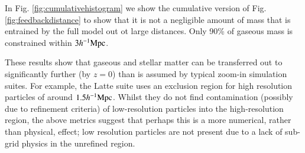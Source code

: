 In Fig. \ref{fig:cumulativehistogram} we show the cumulative version of Fig. 
\ref{fig:feedbackdistance} to show that it is not a negligible amount of mass
that is entrained by the full model out ot large distances. Only 90\% of gaseous
mass is constrained within $3h^{-1}{\rm Mpc}{}$.

These results show that gaseous and stellar matter can be transferred out
to significantly further (by $z=0$) than is assumed by typical zoom-in simulation
suites. For example, the Latte \citep{Wetzel2016} suite uses an exclusion region
for high resolution particles of around $1.5 h^{-1}{\rm Mpc}{}$. Whilst they do not find
contamination (possibly due to refinement criteria) of low-resolution particles
into the high-resolution region, the above metrics suggest that perhaps this is
a more numerical, rather than physical, effect; low resolution particles are
not present due to a lack of sub-grid physics in the unrefined region.
